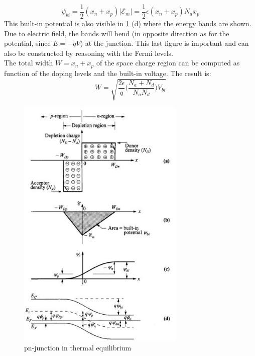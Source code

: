 $$
\psi_{bi} = \frac{1}{2} (x_n + x_p) |\mathcal{E}_m| = \frac{1}{2} \epsilon (x_n + x_p)  N_a x_p
$$
This built-in potential is also visible in \ref{fig:pn_equilibrium} (d) where the energy bands are shown. Due to electric field, the bands will bend (in opposite direction as for the potential, since $E=-qV$) at the junction. This last figure is important and can also be constructed by reasoning with the Fermi levels.\\
The total width $W = x_n + x_p$ of the space charge region can be computed as function of the doping levels and the built-in voltage. The result is:
\begin{equation}
    W = \sqrt{\frac{2 \epsilon}{q} \Big(\frac{N_a + N_d}{N_a N_d}\Big) V_{bi}}
    \label{eq:SCR_width}
\end{equation}

\begin{figure}[h!]
\centering
\includegraphics[width=8cm]{figures/ch01/pn_equilibrium.jpg}
\caption{pn-junction in thermal equilibrium} 
\label{fig:pn_equilibrium}
\end{figure}
